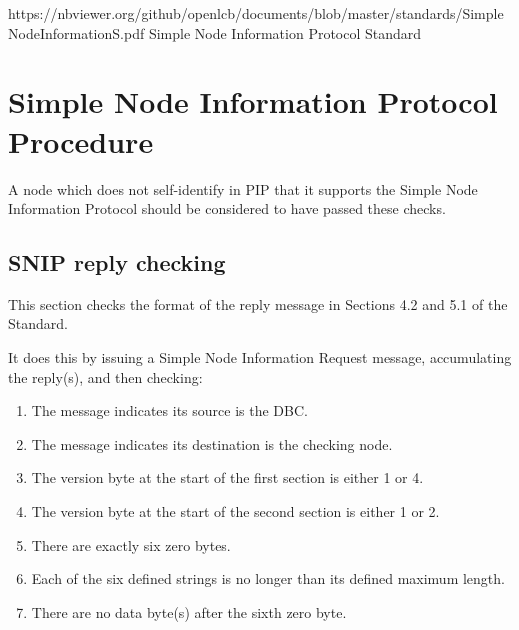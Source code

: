 



\maketitle
\thispagestyle{firststyle}

\introductionCaveats
    {https://nbviewer.org/github/openlcb/documents/blob/master/standards/SimpleNodeInformationS.pdf}
    {Simple Node Information Protocol Standard}

\section{Simple Node Information Protocol Procedure}


A node which does not self-identify in PIP that it supports
the Simple Node Information Protocol should be considered to have passed these checks.
\pipsetFootnote

\subsection{SNIP reply checking}

This section checks the format of the reply message in Sections 4.2 and 5.1 of the Standard.

It does this by issuing a Simple Node Information Request message, 
accumulating the reply(s), and then checking:
    \begin{enumerate}
    \item The message indicates its source is the DBC.
    \item The message indicates its destination is the checking node.
    \item The version byte at the start of the first section is either 1 or 4.
    \item The version byte at the start of the second section is either 1 or 2.
    \item There are exactly six zero bytes.
    \item Each of the six defined strings is no longer than its defined maximum length.
    \item There are no data byte(s) after the sixth zero byte.
    \end{enumerate}

  
